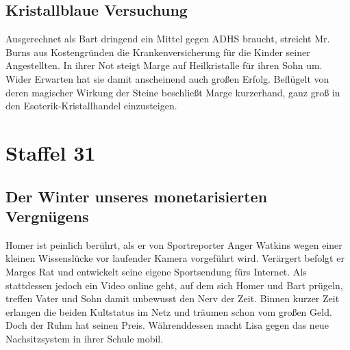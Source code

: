 
\subsection{Kristallblaue Versuchung}
Ausgerechnet als Bart dringend ein Mittel gegen ADHS braucht, streicht Mr. Burns aus Kostengründen die Krankenversicherung für die Kinder seiner Angestellten. In ihrer Not steigt Marge auf Heilkristalle für ihren Sohn um. Wider Erwarten hat sie damit anscheinend auch großen Erfolg. Beflügelt von deren magischer Wirkung der Steine beschließt Marge kurzerhand, ganz groß in den Esoterik-Kristallhandel einzusteigen.


\section{Staffel 31}

\subsection{Der Winter unseres monetarisierten Vergnügens}
Homer ist peinlich berührt, als er von Sportreporter Anger Watkins wegen einer kleinen Wissenslücke vor laufender Kamera vorgeführt wird. Verärgert befolgt er Marges Rat und entwickelt seine eigene Sportsendung fürs Internet. Als stattdessen jedoch ein Video online geht, auf dem sich Homer und Bart prügeln, treffen Vater und Sohn damit unbewusst den Nerv der Zeit. Binnen kurzer Zeit erlangen die beiden Kultstatus im Netz und träumen schon vom großen Geld. Doch der Ruhm hat seinen Preis. Währenddessen macht Lisa gegen das neue Nachsitzsystem in ihrer Schule mobil.


